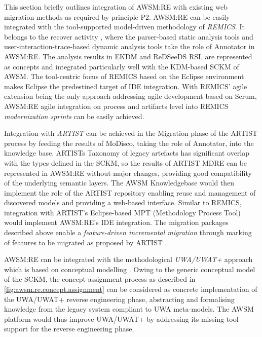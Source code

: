 This section briefly outlines integration of AWSM:RE with existing web migration methods as required by principle P2.
AWSM:RE can be easily integrated with the tool-supported model-driven methodology of \emph{REMICS}.
It belongs to the recover activity \autocite{REMICS2013RecoverPrinciples,Remics2013RecoverToolkit}, where the parser-based static analysis tools and user-interaction-trace-based dynamic analysis tools take the role of Annotator in AWSM:RE.
The analysis results in EKDM and ReDSeeDS RSL are represented as concepts and integrated particularly well with the KDM-based SCKM of AWSM.
The tool-centric focus of REMICS based on the Eclipse environment makes Eclipse the predestined target of IDE integration.
With REMICS' agile extension \autocite{Krasteva2013REMICSAgile} being the only approach addressing agile development based on Scrum, AWSM:RE agile integration on process and artifacts level into REMICS \emph{modernization sprints} can be easily achieved.

Integration with \emph{ARTIST} \autocite{Menychtas2014ARTISTJournal} can be achieved in the Migration phase of the ARTIST process by feeding the results of MoDisco, taking the role of Annotator, into the knowledge base.
ARTISTs Taxonomy of legacy artefacts \autocite{ARTIST2013Taxonomy} has significant overlap with the types defined in the SCKM, so the results of ARTIST MDRE can be represented in AWSM:RE without major changes, providing good compatibility of the underlying semantic layers.
The AWSM Knowledgebase would then implement the role of the ARTIST repository enabling reuse and management of discovered models and providing a web-based interface.
Similar to REMICS, integration with ARTIST's Eclipse-based MPT (Methodology Process Tool) \autocite{ARTIST2015ProcessFramework} would implement AWSM:RE's IDE integration.
The migration packages described above enable a \emph{feature-driven incremental migration} through marking of features to be migrated as proposed by ARTIST \autocite{Menychtas2014ARTISTJournal}.

AWSM:RE can be integrated with the methodological \emph{UWA/UWAT+} approach which is based on conceptual modelling \autocite{Distante2006a,Distante2006CaseStudy}.
Owing to the generic conceptual model of the SCKM, the concept assignment process as described in \cref{fig:awsm.re.concept.assignment} can be considered as concrete implementation of the UWA/UWAT+ reverse engineering phase, abstracting and formalising knowledge from the legacy system compliant to UWA meta-models.
The AWSM platform would thus improve UWA/UWAT+ by addressing its missing tool support for the reverse engineering phase.


